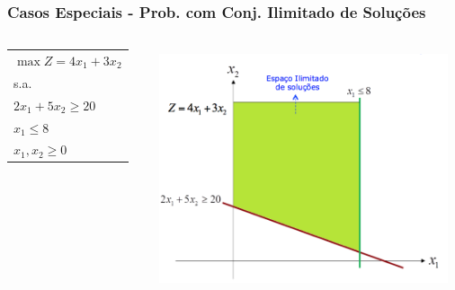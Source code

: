 \documentclass{beamer}
\begin{document}
\begin{frame}
	\frametitle{Casos Especiais - Prob. com Conj. Ilimitado de Soluções}
	\centering
	\begin{columns}
		\begin{column}{0.3\textwidth}
			\begin{mdframed}[backgroundcolor=blue!20] 		
				\scriptsize
				\begin{tabular}{l}
				$\max Z = 4x_1 + 3x_2$ \\
				s.a. \\
				$2x_1+5x_2 \ge 20$ \\
				$x_1 \le 8$ \\
				$x_1, x_2 \ge 0 $ \\ 
				\end{tabular}
			\end{mdframed}
		\end{column}
		\begin{column}{0.7\textwidth}
			\includegraphics[width=8.5cm,height=7cm]{CasosEspeciais-Ilimitado.png}
		\end{column}
	\end{columns}
\end{frame}
\end{document}
